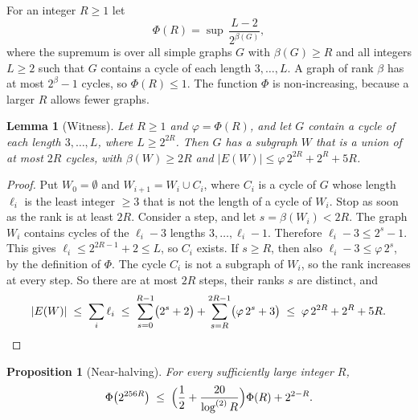 \documentclass[11pt]{article}
\newtheorem{lemma}[theorem]{Lemma}
\newtheorem{proposition}[theorem]{Proposition}
\theoremstyle{definition}
\theoremstyle{remark}
\newcommand{\lgk}[1]{\log^{(#1)}}
\numberwithin{equation}{section}
\begin{document}
For an integer $R\ge1$ let
\[
  \Phi(R)=\sup\,\frac{L-2}{2^{\beta(G)}} ,
\]
where the supremum is over all simple graphs $G$ with $\beta(G)\ge R$ and all integers $L\ge2$ such
that $G$ contains a cycle of each length $3,\dots,L$. A graph of rank $\beta$ has at most
$2^{\beta}-1$ cycles, so $\Phi(R)\le1$. The function $\Phi$ is non-increasing, because a larger $R$
allows fewer graphs.

\begin{lemma}[Witness]\label{lem:witness}
Let $R\ge1$ and $\varphi=\Phi(R)$, and let $G$ contain a cycle of each length $3,\dots,L$, where
$L\ge2^{2R}$. Then $G$ has a subgraph $W$ that is a union of at most $2R$ cycles, with
$\beta(W)\ge2R$ and $|E(W)|\le\varphi\,2^{2R}+2^{R}+5R$.
\end{lemma}

\begin{proof}
Put $W_0=\emptyset$ and $W_{i+1}=W_i\cup C_i$, where $C_i$ is a cycle of $G$ whose length $\ell_i$ is
the least integer $\ge3$ that is not the length of a cycle of $W_i$. Stop as soon as the rank is at
least $2R$. Consider a step, and let $s=\beta(W_i)<2R$. The graph $W_i$ contains cycles of the
$\ell_i-3$ lengths $3,\dots,\ell_i-1$. Therefore $\ell_i-3\le2^{s}-1$. This gives
$\ell_i\le2^{2R-1}+2\le L$, so $C_i$ exists. If $s\ge R$, then also $\ell_i-3\le\varphi\,2^{s}$, by
the definition of $\Phi$. The cycle $C_i$ is not a subgraph of $W_i$, so the rank increases at every
step. So there are at most $2R$ steps, their ranks $s$ are distinct, and
\[
  |E(W)|\;\le\;\sum_i\ell_i\;\le\;\sum_{s=0}^{R-1}\bigl(2^{s}+2\bigr)+\sum_{s=R}^{2R-1}\bigl(\varphi\,2^{s}+3\bigr)
  \;\le\;\varphi\,2^{2R}+2^{R}+5R .\qedhere
\]
\end{proof}

\begin{proposition}[Near-halving]\label{prop:halving}
For every sufficiently large integer $R$,
\[
  \Phi\bigl(2^{256R}\bigr)\;\le\;\Bigl(\frac12+\frac{20}{\lgk{2}R}\Bigr)\Phi(R)+2^{2-R}.
\]
\end{proposition}
\end{document}

